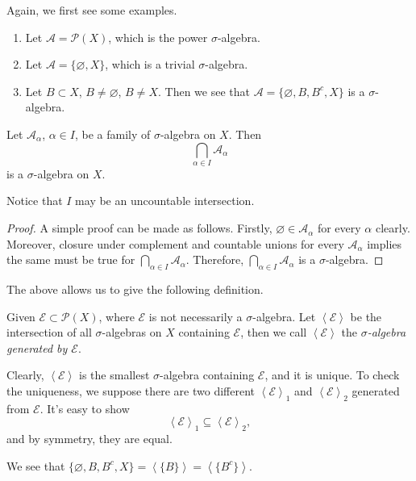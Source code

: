 \begin{eg}
	Again, we first see some examples.
	\begin{enumerate}
		\item Let \(\mathcal{A} = \mathcal{P} (X)\), which is the power \(\sigma\)-algebra.
		\item Let \(\mathcal{A} = \{\varnothing , X\}\), which is a trivial \(\sigma\)-algebra.
		\item Let \(B\subset X\), \(B\neq \varnothing \), \(B\neq X\). Then we see that \(\mathcal{A} = \{\varnothing , B, B^{c}, X\}\) is a \(\sigma\)-algebra.
	\end{enumerate}
\end{eg}

\begin{lemma}
	Let \(\mathcal{A}_{\alpha}\), \(\alpha\in I\), be a family of \(\sigma\)-algebra on \(X\). Then
	\[
		\bigcap\limits_{\alpha\in I} \mathcal{A}_{\alpha}
	\]
	is a \(\sigma\)-algebra on \(X\).
\end{lemma}
\begin{remark}
	Notice that \(I\) may be an uncountable intersection.
\end{remark}
\begin{proof}
	A simple proof can be made as follows. Firstly, \(\varnothing \in \mathcal{A}_{\alpha}\) for every \(\alpha\) clearly.
	Moreover, closure under complement and countable unions for every \(\mathcal{A}_{\alpha}\) implies the same must be true for \(\bigcap\limits_{\alpha\in I} \mathcal{A}_{\alpha}\).
	Therefore, \(\bigcap\limits_{\alpha\in I} \mathcal{A}_{\alpha}\) is a \(\sigma\)-algebra.
\end{proof}

The above allows us to give the following definition.
\begin{definition}
	Given \(\mathcal{E} \subset \mathcal{P} (X) \), where \(\mathcal{E}\) is not necessarily a \(\sigma\)-algebra. Let
	\(\left<\mathcal{E}\right>\) be the intersection of all \(\sigma\)-algebras on \(X\) containing \(\mathcal{E}\), then
	we call \(\left<\mathcal{E} \right>\) the \emph{\(\sigma\)-algebra generated by \(\mathcal{E}\)}.
\end{definition}

\begin{remark}
	Clearly, \(\left<\mathcal{E} \right>\) is the smallest \(\sigma\)-algebra containing \(\mathcal{E}\), and it is unique.
	To check the uniqueness, we suppose there are two different \(\left<\mathcal{E}\right>_1\) and \(\left<\mathcal{E}\right>_2\)
	generated from \(\mathcal{E} \). It's easy to show
	\[
		\left<\mathcal{E}\right>_1\subseteq \left<\mathcal{E}\right>_2,
	\]
	and by symmetry, they are equal.
\end{remark}
\begin{eg}
	We see that \(\{\varnothing , B, B^{c} , X\}= \left<\{B\}\right> = \left<\{B^{c} \}\right>\).
\end{eg}

